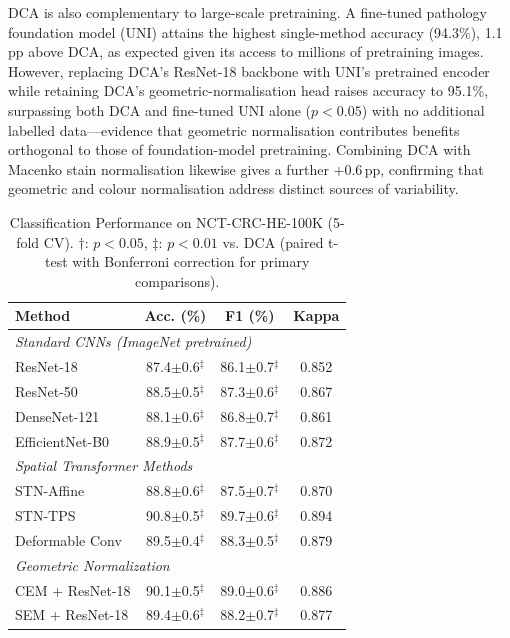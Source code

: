 DCA is also complementary to large-scale pretraining. A fine-tuned pathology
foundation model (UNI) attains the highest single-method accuracy (94.3\%),
1.1\,pp above DCA, as expected given its access to millions of pretraining
images. However, replacing DCA's ResNet-18 backbone with UNI's pretrained encoder
while retaining DCA's geometric-normalisation head raises accuracy to 95.1\%,
surpassing both DCA and fine-tuned UNI alone ($p<0.05$) with no additional
labelled data---evidence that geometric normalisation contributes benefits
orthogonal to those of foundation-model pretraining. Combining DCA with Macenko
stain normalisation likewise gives a further $+0.6$\,pp, confirming that
geometric and colour normalisation address distinct sources of variability.

\begin{table}[t]
\centering
\caption{Classification Performance on NCT-CRC-HE-100K (5-fold CV). $\dagger$: $p<0.05$, $\ddagger$: $p<0.01$ vs. DCA (paired t-test with Bonferroni correction for primary comparisons).}
\label{tab:main_results}
\begin{tabularx}{\textwidth}{Xccc}
\hline
\textbf{Method} & \textbf{Acc. (\%)} & \textbf{F1 (\%)} & \textbf{Kappa} \\
\hline
\multicolumn{4}{l}{\textit{Standard CNNs (ImageNet pretrained)}} \\
ResNet-18 & 87.4$\pm$0.6$^\ddagger$ & 86.1$\pm$0.7$^\ddagger$ & 0.852 \\
ResNet-50 & 88.5$\pm$0.5$^\ddagger$ & 87.3$\pm$0.6$^\ddagger$ & 0.867 \\
DenseNet-121 & 88.1$\pm$0.6$^\ddagger$ & 86.8$\pm$0.7$^\ddagger$ & 0.861 \\
EfficientNet-B0 & 88.9$\pm$0.5$^\ddagger$ & 87.7$\pm$0.6$^\ddagger$ & 0.872 \\
\hline
\multicolumn{4}{l}{\textit{Spatial Transformer Methods}} \\
STN-Affine & 88.8$\pm$0.6$^\ddagger$ & 87.5$\pm$0.7$^\ddagger$ & 0.870 \\
STN-TPS & 90.8$\pm$0.5$^\ddagger$ & 89.7$\pm$0.6$^\ddagger$ & 0.894 \\
Deformable Conv & 89.5$\pm$0.4$^\ddagger$ & 88.3$\pm$0.5$^\ddagger$ & 0.879 \\
\hline
\multicolumn{4}{l}{\textit{Geometric Normalization}} \\
CEM + ResNet-18 & 90.1$\pm$0.5$^\ddagger$ & 89.0$\pm$0.6$^\ddagger$ & 0.886 \\
SEM + ResNet-18 & 89.4$\pm$0.6$^\ddagger$ & 88.2$\pm$0.7$^\ddagger$ & 0.877 \\

\end{tabularx}
\end{table}
